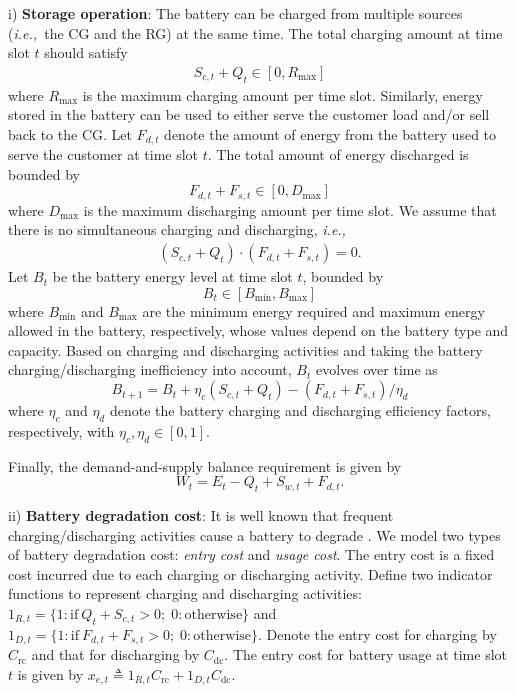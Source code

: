 \documentclass[journal]{IEEEtran}
\def\ie{{\it i.e.,\ \/}}
\begin{document}
i) {\bf Storage operation}: The battery can be charged from multiple sources (\ie the CG and the RG) at the same time.
The total charging amount at time slot $t$ should satisfy
\begin{align}
S_{c,t}+Q_t\in[0,R_{\max}]\label{eqn:rc_bds}
\end{align}
where $R_{\max}$ is the maximum charging amount per time slot. Similarly, energy stored in the battery can be used to either serve the customer load and/or sell back to the CG. Let $F_{d,t}$ denote the amount of energy from the battery used to serve the customer at time slot $t$.
The total amount of energy discharged is bounded by
\begin{equation}
\label{eqn:dc_bds}
F_{d,t}+F_{s,t}\in[0,D_{\max}]
\end{equation}
where $D_{\max}$ is the maximum discharging amount per time slot. We assume that there is no simultaneous charging and discharging, \ie
\begin{align} \label{eqn:rc_dc_constr}
(S_{c,t}+Q_t)\cdot(F_{d,t}+F_{s,t})= 0.
\end{align}
Let $B_t$ be the battery energy level at time slot $t$, bounded by
\begin{equation} \label{eqn:Yt bds}
 B_t\in [B_{\min}, B_{\max}]
\end{equation}
where $B_{\min}$ and $B_{\max}$ are the minimum  energy required and maximum energy allowed in the battery, respectively, whose values depend on the battery type and capacity. Based on charging and discharging activities and taking the battery charging/discharging inefficiency into account, $B_t$ evolves over time as
\begin{equation}
\label{eqn:dynamics of SOB}
B_{t+1}=B_t+\eta_c(S_{c,t}+Q_t)-(F_{d,t}+F_{s,t})/\eta_d
\end{equation}
where $\eta_c$ and $\eta_d$ denote the battery charging and discharging efficiency factors, respectively, with $\eta_c,\eta_d\in[0,1]$.

Finally, the demand-and-supply balance requirement is given by
\begin{equation}
\label{eqn:Wt_constraint}
W_t=E_t-Q_t+S_{w,t}+F_{d,t}.
\end{equation}

ii) {\bf Battery degradation cost}:
It is well known that frequent charging/discharging activities cause a battery to degrade \cite{Ramadrass:JPS02}.  We model two types of battery degradation cost:  \emph{entry cost} and \emph{usage cost}. The entry cost is a fixed cost incurred due to each charging or discharging activity.  Define two indicator functions to represent charging and discharging activities: ${1_{R,t}=\{1: \textrm{if}\ Q_t+S_{c,t}>0; \; 0: \textrm{otherwise}\}}$ and ${1_{D,t}=\{1: \textrm{if}\ F_{d,t}+F_{s,t}>0; \; 0: \textrm{otherwise}\}}$. Denote the entry cost for charging by $C_{\textrm{rc}}$ and that for discharging by $C_{\textrm{dc}}$. The entry cost for battery usage at time slot $t$ is given by $x_{e,t}\triangleq 1_{R,t}C_{\textrm{rc}}+1_{D,t}C_{\textrm{dc}}$.
\end{document}
